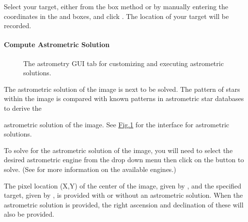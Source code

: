\documentclass[letterpaper,11pt,english]{sphinxmanual}
\begin{document}
\sphinxAtStartPar
Select your target, either from the box method or by manually entering the
coordinates in the  and  boxes, and
click . The location of your target will be recorded.


\paragraph{Compute Astrometric Solution}
\label{\detokenize{user/manual_mode:compute-astrometric-solution}}\label{\detokenize{user/manual_mode:user-manual-mode-procedure-find-asteroid-location-compute-astrometric-solution}}
\begin{figure}[htbp]
\centering
\capstart

\noindent{}
\caption{The astrometry GUI tab for customizing and executing astrometric solutions.}\label{\detokenize{user/manual_mode:id5}}\label{\detokenize{user/manual_mode:figure-manual-mode-gui-astrometry}}\end{figure}

\sphinxAtStartPar
The astrometric solution of the image is next to be solved. The pattern of
stars within the image is compared with known patterns in astrometric star
databases to derive the %
\begin{footnote}[6]\sphinxAtStartFootnote
{}
%
\end{footnote}
astrometric solution of the image. See \hyperref[\detokenize{user/manual_mode:figure-manual-mode-gui-astrometry}]{Fig.\@ \ref{\detokenize{user/manual_mode:figure-manual-mode-gui-astrometry}}}
for the interface for astrometric solutions.

\sphinxAtStartPar
To solve for the astrometric solution of the image, you will need to select
the desired astrometric engine from the drop down menu then click on the
 button to solve.
(See {\hyperref[\detokenize{technical/architecture/services_engines:technical-architecture-services-engines}]{}} for more information on
the available engines.)

\sphinxAtStartPar
The pixel location (X,Y) of the center of the image, given by ,
and the specified target, given by , is provided
with or without an astrometric solution. When the astrometric solution is
provided, the right ascension and declination of these will also be provided.
\end{document}
